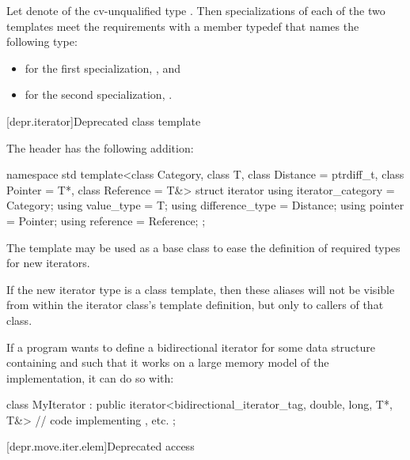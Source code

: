 \begin{itemdescr}
\pnum
Let  denote 
of the cv-unqualified type .
Then specializations of each of the two templates meet
the  requirements
with a member typedef  that names the following type:
\begin{itemize}
\item for the first specialization, , and
\item for the second specialization, .
\end{itemize}
\end{itemdescr}

[depr.iterator]{Deprecated  class template}

\pnum
The header  has the following addition:
%
\begin{codeblock}
namespace std {
  template<class Category, class T, class Distance = ptrdiff_t,
           class Pointer = T*, class Reference = T&>
  struct iterator {
    using iterator_category = Category;
    using value_type        = T;
    using difference_type   = Distance;
    using pointer           = Pointer;
    using reference         = Reference;
  };
}
\end{codeblock}

\pnum
The
template may be used as a base class to ease the definition of required types
for new iterators.

\pnum
\begin{note}
If the new iterator type is a class template, then these aliases
will not be visible from within the iterator class's template definition, but
only to callers of that class.
\end{note}

\pnum
\begin{example}
If a \Cpp{} program wants to define a bidirectional iterator for some data
structure containing  and such that it works on a large memory
model of the implementation, it can do so with:
\begin{codeblock}
class MyIterator :
  public iterator<bidirectional_iterator_tag, double, long, T*, T&> {
  // code implementing \tcode{++}, etc.
};
\end{codeblock}
\end{example}

[depr.move.iter.elem]{Deprecated  access}


